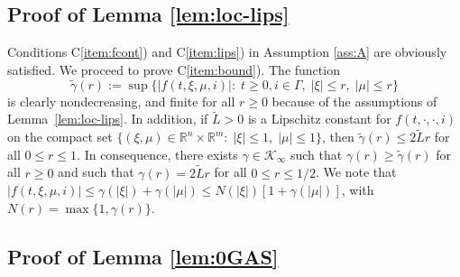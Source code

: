 \documentclass[9pt,final,journal]{IEEEtran}
\def\K{\mathcal{K}}
\def\Ki{\K_{\infty}}
\def\R{\mathbb{R}}
\begin{document}
\subsection{Proof of Lemma \ref{lem:loc-lips}}
Conditions C\ref{item:fcont}) and C\ref{item:lips}) in Assumption \ref{ass:A} are obviously satisfied. We proceed to prove C\ref{item:bound}). The function
$$ \tilde \gamma(r):=\sup\{|f(t,\xi,\mu,i)|:\;t\ge 0, i\in \Gamma,\;|\xi|\le r,\;|\mu|\le r\}$$
is clearly nondecreasing, and finite for all $r\ge 0$ because of the assumptions of Lemma~\ref{lem:loc-lips}. In addition, if $\tilde{L}>0$ is a Lipschitz constant for $f(t,\cdot,\cdot,i)$ on the compact set $\{(\xi,\mu)\in \R^{n}\times \R^{m}:\;|\xi|\le 1,\;|\mu|\le 1\}$, then $\tilde{\gamma}(r)\le 2\tilde{L} r$ for all $0\le r\le 1$.
%
In consequence, there exists $\gamma\in \Ki$ such that $\gamma(r)\ge \tilde{\gamma}(r)$ for all $r\ge 0$ and such that $\gamma(r)=2\tilde{L} r$ for all $0\le r \le 1/2$. We note that $|f(t,\xi,\mu,i)|\le \gamma(|\xi|)+\gamma(|\mu|)\le N(|\xi|)[1+\gamma(|\mu|)]$, with $N(r)=\max\{1,\gamma(r)\}$.\hfill\QED
%
% 
\subsection{Proof of Lemma \ref{lem:0GAS}}
\label{sec:proof-lemma-refl}
\end{document}
